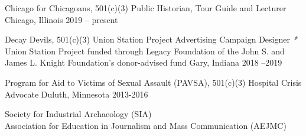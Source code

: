 \begin{cvhonors}
  \cvhonor
    {Chicago for Chicagoans, 501(c)(3) } 
    {Public Historian, Tour Guide and Lecturer } 
    {Chicago, Illinois} 
    {2019 -- present} 

  \cvhonor
    {Decay Devils, 501(c)(3) } %
    {Union Station Project Advertising Campaign Designer \scriptsize{\textit{*} Union Station Project funded through Legacy Foundation of the John S. and James L. Knight Foundation's donor-advised fund}} %
    {Gary, Indiana} %
    {2018 --2019} %
    
  \cvhonor
    {Program for Aid to Victims of Sexual Assault (PAVSA), 501(c)(3) } 
    {Hospital Crisis Advocate} 
    {Duluth, Minnesota} 
    {2013-2016} 
\end{cvhonors}


\begin{small} \color{black}
Society for Industrial Archaeology (SIA)
\\
Association for Education in Journalism and Mass Communication (AEJMC)  \\
\end{small}





